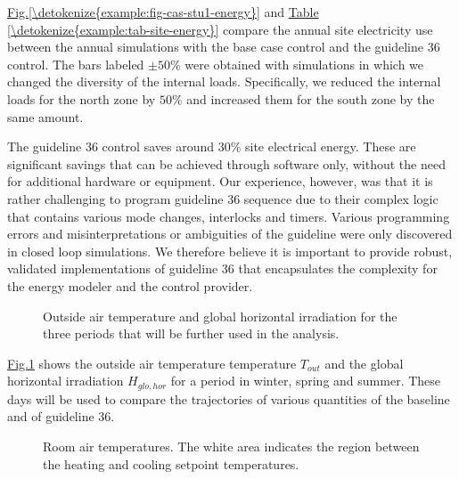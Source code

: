 \documentclass[letterpaper,10pt, openany,english]{sphinxmanual}
\begin{document}
\hyperref[\detokenize{example:fig-cas-stu1-energy}]{Fig.\@ \ref{\detokenize{example:fig-cas-stu1-energy}}} and
\hyperref[\detokenize{example:tab-site-energy}]{Table \ref{\detokenize{example:tab-site-energy}}} compare the annual
site electricity use between
the annual simulations with the base case control
and the guideline 36 control.
The bars labeled \(\pm 50\%\) were obtained with simulations in which we
changed the diversity of the internal loads.
Specifically, we reduced the internal loads for the north zone by \(50\%\)
and increased them for the south zone by the same amount.

The guideline 36 control saves around \(30\%\)
site electrical energy. These are significant savings
that can be achieved through software only, without the need
for additional hardware or equipment.
Our experience, however, was that it is rather challenging to
program guideline 36 sequence due to their complex logic
that contains various mode changes, interlocks and timers.
Various programming errors and misinterpretations or ambiguities
of the guideline were only discovered in closed loop simulations.
We therefore believe it is important to provide robust, validated
implementations of guideline 36 that encapsulates the complexity for the
energy modeler and the control provider.

\begin{figure}[htbp]
\centering
\capstart

\noindent{}
\caption{Outside air temperature and global horizontal irradiation for the
three periods that will be further used in the analysis.}\label{\detokenize{example:id25}}\label{\detokenize{example:fig-outside}}\end{figure}

\hyperref[\detokenize{example:fig-outside}]{Fig.\@ \ref{\detokenize{example:fig-outside}}}
shows the outside air temperature temperature \(T_{out}\) and
the global horizontal irradiation \(H_{glo,hor}\) for
a period in winter, spring and summer. These days will
be used to compare the trajectories of various quantities of the baseline
and of guideline 36.

\begin{figure}[htbp]
\centering
\capstart

\noindent{}
\caption{Room air temperatures. The white area indicates the region between the heating and cooling setpoint temperatures.}\label{\detokenize{example:id26}}\label{\detokenize{example:fig-troom-all}}\end{figure}
\end{document}

